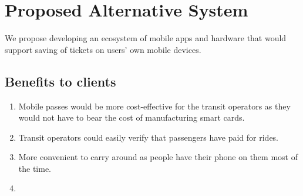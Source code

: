\documentclass{article}
\begin{document}
\section{Proposed Alternative System}
	We propose developing an ecosystem of mobile apps and hardware that would support saving of tickets on users' own mobile devices.
	\subsection{Benefits to clients}
		\begin{enumerate}
			\item Mobile passes would be more cost-effective for the transit operators as they would not have to bear the cost of manufacturing smart cards.
			\item Transit operators could easily verify that passengers have paid for rides.
			\item More convenient to carry around as people have their phone on them most of the time.
			\item 
		\end{enumerate}
\end{document}
